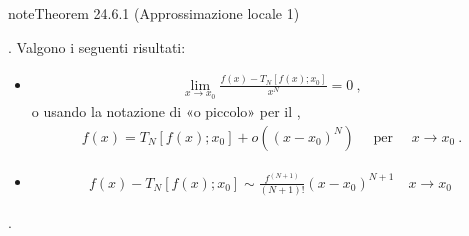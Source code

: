 \documentclass[letterpaper,10pt,italian]{jupyterBook}
\begin{document}
\begin{sphinxadmonition}{note}{Theorem 24.6.1 (Approssimazione locale \sphinxhyphen{} 1)}



\sphinxAtStartPar
{} . Valgono i seguenti risultati:
\begin{itemize}
\item {} \begin{equation*}
\begin{split}\lim_{x \rightarrow x_0} \frac{f(x) - T_N[f(x); x_0]}{x^N} = 0 \ , \end{split}
\end{equation*}
\sphinxAtStartPar
o usando la notazione di «o piccolo» per il {\hyperref[\detokenize{ch/infinitesimal_calculus/analysis:infinitesimal-calculus-limits-infinite-simal}]{}},
\begin{equation*}
\begin{split}f(x) = T_N[f(x); x_0] + o\left((x-x_0)^N\right) \quad \text{ per } \quad x \rightarrow x_0 \ .\end{split}
\end{equation*}
\item {} \begin{equation*}
\begin{split}f(x) - T_N[f(x); x_0] \sim \frac{f^{(N+1)}}{(N+1)!} (x - x_0)^{N+1} \quad x \rightarrow x_0 \ \end{split}
\end{equation*}
\end{itemize}
\end{sphinxadmonition}

\sphinxAtStartPar
{\hyperref[\detokenize{ch/infinitesimal_calculus/derivatives-notes:infinitesimal-calculus-derivatives-taylor-notes}]{}}.
\end{document}
